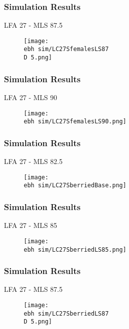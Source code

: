 \documentclass{beamer}
\newcommand{\ebh}{\string~/bio.data/bio.lobster/figures/LFA2733Framework2018/} %
\newcommand{\D}{.}
\begin{document}
\begin{frame}
\frametitle{Simulation Results}
LFA 27 - MLS 87.5
\begin{figure}
        \begin{center}
            \texttt{[image: \\ebh sim/LC27SfemalesLS87\\D 5.png]}
        \end{center}
    \end{figure}
\end{frame}


\begin{frame}
\frametitle{Simulation Results}
LFA 27 - MLS 90
\begin{figure}
        \begin{center}
            \texttt{[image: \\ebh sim/LC27SfemalesLS90.png]}
        \end{center}
    \end{figure}
\end{frame}




\begin{frame}
\frametitle{Simulation Results}
LFA 27 - MLS 82.5
\begin{figure}
        \begin{center}
            \texttt{[image: \\ebh sim/LC27SberriedBase.png]}
        \end{center}
    \end{figure}
\end{frame}



\begin{frame}
\frametitle{Simulation Results}
LFA 27 - MLS 85
\begin{figure}
        \begin{center}
            \texttt{[image: \\ebh sim/LC27SberriedLS85.png]}
        \end{center}
    \end{figure}
\end{frame}


\begin{frame}
\frametitle{Simulation Results}
LFA 27 - MLS 87.5
\begin{figure}
        \begin{center}
            \texttt{[image: \\ebh sim/LC27SberriedLS87\\D 5.png]}
        \end{center}
    \end{figure}
\end{frame}
\end{document}
